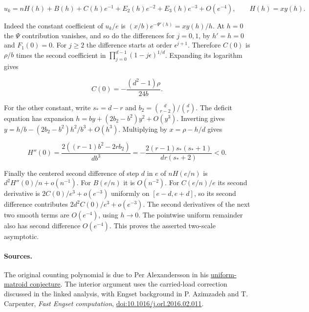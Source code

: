 \documentclass[11pt]{article}
\begin{document}
\begin{equation*}
u_k=nH(h)+B(h)+C(h)e^{-1}+E_2(h)e^{-2}+E_3(h)e^{-3}+O(e^{-4}),
\qquad H(h)=xy(h).
\end{equation*}

Indeed the constant coefficient of $u_k/e$ is $(x/b)e^{-\Psi'(h)}=xy(h)/h$. At $h=0$ the $\Psi$ contribution vanishes, and so do the differences for $j=0,1$, by $h'=h=0$ and $F_1(0)=0$. For $j\ge2$ the difference starts at order $\epsilon^{j+1}$. Therefore $C(0)$ is $\rho/b$ times the second coefficient in $\prod_{j=0}^{d-1}(1-j\epsilon)^{1/d}$. Expanding its logarithm gives

\begin{equation*}
C(0)=-\frac{(d^2-1)\rho}{24b}.
\end{equation*}

For the other constant, write $s_{\ast}=d-r$ and $b_2=\binom d{r-2}/\binom dr$. The deficit equation has expansion $h=b y+(2b_2-b^2)y^2+O(y^3)$. Inverting gives $y=h/b-(2b_2-b^2)h^2/b^3+O(h^3)$. Multiplying by $x=\rho-h/d$ gives

\begin{equation*}
H''(0)
=\frac{2((r-1)b^2-2r b_2)}{d b^3}
=-\frac{2(r-1)s_{\ast}(s_{\ast}+1)}{d r(s_{\ast}+2)}<0.
\end{equation*}

Finally the centered second difference of step $d$ in $e$ of $nH(e/n)$ is $d^2H''(0)/n+o(n^{-1})$. For $B(e/n)$ it is $O(n^{-2})$. For $C(e/n)/e$ its second derivative is $2C(0)/e^3+o(e^{-3})$ uniformly on $[e-d,e+d]$, so its second difference contributes $2d^2 C(0)/e^3+o(e^{-3})$. The second derivatives of the next two smooth terms are $O(e^{-4})$, using $h\to0$. The pointwise uniform remainder also has second difference $O(e^{-4})$. This proves the asserted two-scale asymptotic.

\paragraph{Sources.}
The original counting polynomial is due to Per Alexandersson in his
\href{https://www.symmetricfunctions.com/realRootedOpenProblems.htm\#conjBalancedArrays}{uniform-matroid conjecture}.
The interior argument uses the carried-load correction discussed in the
linked analysis, with Engset background in P. Azimzadeh and T. Carpenter,
\emph{Fast Engset computation},
\href{https://doi.org/10.1016/j.orl.2016.02.011}{doi:10.1016/j.orl.2016.02.011}.
\end{document}
